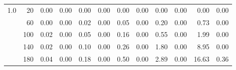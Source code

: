 \begin{table}[h!]
{\begin{tabular}{@{}lrrrrrrrrrrr@{}}
\multicolumn{1}{r}{1.0}          & 20                              & 0.00                         & 0.00                         & 0.00                         & 0.00                         & 0.00
                               & 0.00                       & 0.00                          & 0.00                     & 0.00                          & 0.00                        \\
                               & 60                              & 0.00                          & 0.00                        & 0.02                          & 0.00                         & 0.05                          & 0.00                         & 0.20                          & 0.00                         & 0.73                         & 0.00                         \\
                               & 100                             & 0.02                          & 0.00                        & 0.05                          & 0.00                         & 0.16                       & 0.00                        & 0.55                      & 0.00                         & 1.99                        & 0.00                         \\
                               & 140                             & 0.02                          & 0.00                         & 0.10                          & 0.00                         & 0.26                       & 0.00                         & 1.80                        & 0.00                        & 8.95                        & 0.00                         \\
                               & 180                             & 0.04                          & 0.00                         & 0.18                          & 0.00                         & 0.50                       & 0.00                         & 2.89                        & 0.00                         & 16.63                       & 0.36                         \\ \bottomrule
\end{tabular}%
}
\end{table}